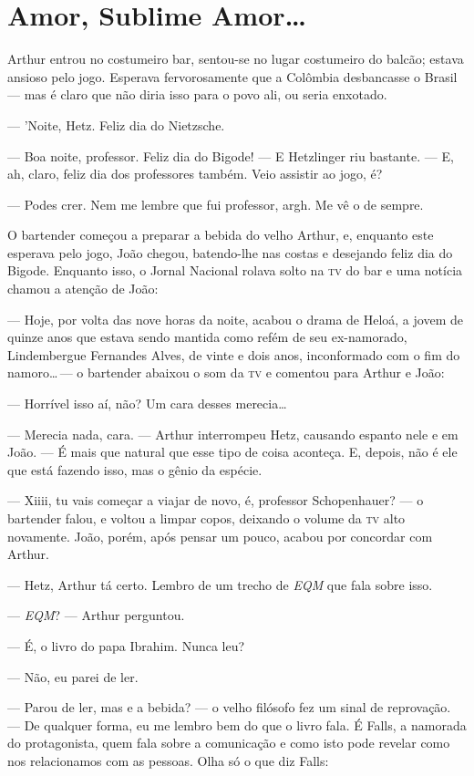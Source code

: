 \chapter{Amor, Sublime Amor\ldots}

Arthur entrou no costumeiro bar, sentou-se no lugar costumeiro do balcão; estava ansioso pelo jogo. Esperava fervorosamente que a Co\-lômbia desbancasse o Brasil --- mas é claro que não diria isso para o povo ali, ou seria enxotado.

--- 'Noite, Hetz. Feliz dia do Nietzsche.

--- Boa noite, professor. Feliz dia do Bigode! --- E Hetzlinger riu bastante. --- E, ah, claro, feliz dia dos professores também. Veio assistir ao jogo, é?

--- Podes crer. Nem me lembre que fui professor, argh. Me vê o de sempre.

O bartender começou a preparar a bebida do velho Arthur, e, enquanto este esperava pelo jogo, João chegou, batendo-lhe nas costas e desejando feliz dia do Bigode. Enquanto isso, o Jornal Nacional rolava solto na \textsc{tv} do bar e uma notícia chamou a atenção de João:

--- Hoje, por volta das nove horas da noite, acabou o drama de Heloá, a jovem de quinze anos que estava sendo mantida como refém de seu ex-namorado, Lindembergue Fernandes Alves, de vinte e dois anos, inconformado com o fim do namoro\ldots\,--- o bartender abaixou o som da \textsc{tv} e comentou para Arthur e João:

--- Horrível isso aí, não? Um cara desses merecia\ldots

--- Merecia nada, cara. --- Arthur interrompeu Hetz, causando espanto nele e em João. --- É mais que natural que esse tipo de coisa aconteça. E, depois, não é ele que está fazendo isso, mas o gênio da espécie.

--- Xiiii, tu vais começar a viajar de novo, é, professor Schopenhauer? --- o bartender falou, e voltou a limpar copos, deixando o volume da \textsc{tv} alto novamente. João, porém, após pensar um pouco, acabou por concordar com Arthur.

--- Hetz, Arthur tá certo. Lembro de um trecho de \emph{EQM} que fala sobre isso.

--- \emph{EQM\/}? --- Arthur perguntou.

--- É, o livro do papa Ibrahim. Nunca leu?

--- Não, eu parei de ler.

--- Parou de ler, mas e a bebida? --- o velho filósofo fez um sinal de reprovação. --- De qualquer forma, eu me lembro bem do que o livro fala. É Falls, a namorada do protagonista, quem fala sobre a comunicação e como isto pode revelar como nos relacionamos com as pessoas. Olha só o que diz Falls:

